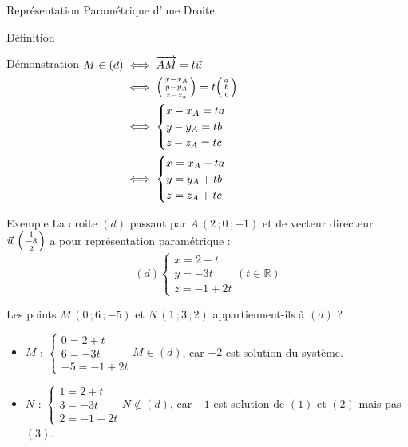 \documentclass{cours}
\begin{document}
\begin{Gpartie}{Représentation Paramétrique d'une Droite}
\begin{Spartie}{Définition}
\begin{SSpartie}{Démonstration}
                $\begin{aligned}[t]
                    M\in(d)&\iff\overrightarrow{AM}=t\vec{u} \\
                    &\iff\begin{psmallmatrix} x-x_A \\ y-y_A \\ z-z_a \end{psmallmatrix}=t\begin{psmallmatrix} a \\ b \\ c \end{psmallmatrix} \\
                    &\iff\begin{cases}x-x_A=ta \\ y-y_A=tb \\ z-z_A= t c \end{cases} \\ %
                    &\iff\begin{cases}x=x_A+ta \\ y=y_A+tb \\ z=z_A+ t c \end{cases}
                \end{aligned}$
            \end{SSpartie}
        \end{Spartie}
        \begin{Spartie}{Exemple} 
            La droite $(d)$ passant par $A\,\left(2\,;0\,;-1\right)$ et de vecteur directeur $\vec{u}~\begin{psmallmatrix}1 \\ -3 \\ 2\end{psmallmatrix}$ a pour représentation paramétrique : \[(d)\begin{cases} x=2+t \\ y=-3t \\ z=-1+2t
            \end{cases}\left(t\in\mathbb{R}\right)\]

            Les points $M\,\left(0\,;6\,;-5\right)$ et $N\,\left(1\,;3\,;2\right)$ appartiennent-ils à $(d)$ ?
            \begin{itemize}
                \item $M$ : $\begin{cases} 0=2+t \\ 6=-3t \\ -5=-1+2t \end{cases}M\in(d)$, car $-2$ est solution du système.
                \item $N$ : $\begin{cases} 1=2+t \\ 3=-3t \\ 2=-1+2t \end{cases}N\notin(d)$, car $-1$ est solution de $(1)$ et $(2)$ mais pas $(3)$.
            \end{itemize}
        \end{Spartie}
    \end{Gpartie}
\end{document}
